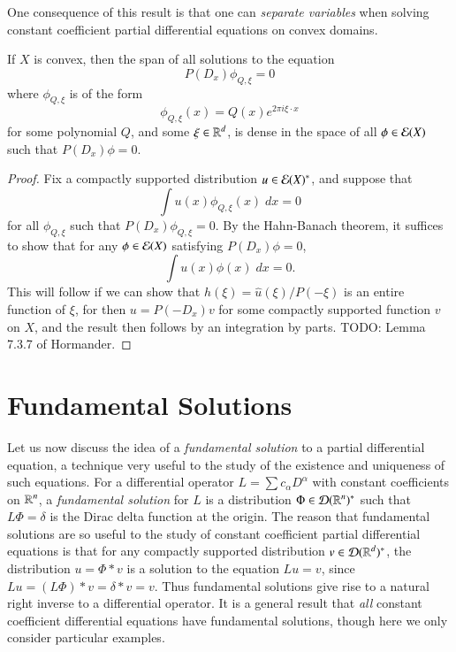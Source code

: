 One consequence of this result is that one can \emph{separate variables} when solving constant coefficient partial differential equations on convex domains.

\begin{theorem}
    If $X$ is convex, then the span of all solutions to the equation
    \[ P(D_x) \phi_{Q,\xi} = 0 \]
    where $\phi_{Q,\xi}$ is of the form
    \[ \phi_{Q,\xi}(x) = Q(x) e^{2 \pi i \xi \cdot x} \]
    for some polynomial $Q$, and some $\xi \in \operatorname{\mathbb{R}}^d$, is dense in the space of all $\phi \in \operatorname{\mathcal{E}}(X)$ such that $P(D_x) \phi = 0$.
\end{theorem}
\begin{proof}
    Fix a compactly supported distribution $u \in \operatorname{\mathcal{E}}(X)^*$, and suppose that
    \[ \int u(x) \phi_{Q,\xi}(x)\; dx = 0 \]
    for all $\phi_{Q,\xi}$ such that $P(D_x) \phi_{Q,\xi} = 0$. By the Hahn-Banach theorem, it suffices to show that for any $\phi \in \operatorname{\mathcal{E}}(X)$ satisfying $P(D_x) \phi = 0$,
    \[ \int u(x) \phi(x)\; dx = 0. \]
    This will follow if we can show that $h(\xi) = \widehat{u}(\xi) / P(-\xi)$ is an entire function of $\xi$, for then $u = P(-D_x) v$ for some compactly supported function $v$ on $X$, and the result then follows by an integration by parts. TODO: Lemma 7.3.7 of Hormander.
\end{proof}






\section{Fundamental Solutions}

Let us now discuss the idea of a \emph{fundamental solution} to a partial differential equation, a technique very useful to the study of the existence and uniqueness of such equations. For a differential operator $L = \sum c_\alpha D^\alpha$ with constant coefficients on $\operatorname{\mathbb{R}}^n$, a \emph{fundamental solution} for $L$ is a distribution $\Phi \in \operatorname{\mathcal{D}}(\operatorname{\mathbb{R}}^n)^*$ such that $L\Phi = \delta$ is the Dirac delta function at the origin. The reason that fundamental solutions are so useful to the study of constant coefficient partial differential equations is that for any compactly supported distribution $v \in \operatorname{\mathcal{D}}(\operatorname{\mathbb{R}}^d)^*$, the distribution $u = \Phi * v$ is a solution to the equation $Lu = v$, since $L u = (L \Phi) * v = \delta * v = v$. Thus fundamental solutions give rise to a natural right inverse to a differential operator. It is a general result that \emph{all} constant coefficient differential equations have fundamental solutions, though here we only consider particular examples.

